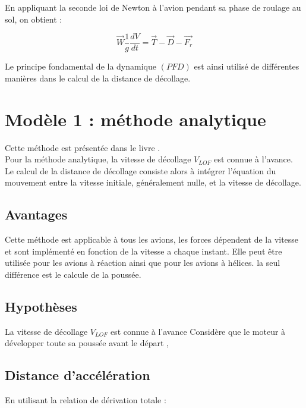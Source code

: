 	
	En appliquant la seconde loi de Newton à l’avion pendant sa phase de roulage au sol, on obtient :	
	
	\begin{equation} \label{PFD}
		\vec{W} \frac{1}{g}\frac{dV}{dt}=\vec{T} - \vec{D} - \vec{F_r} 
	\end{equation}
	
	
	Le principe fondamental de la dynamique $(PFD)$ est ainsi utilisé de différentes manières dans le calcul de la distance de décollage.
	
	
	
	
	
	
	
	
	
	
	\section{ Modèle 1 : méthode analytique }
		Cette méthode est présentée dans le livre  \cite{War:09}. \\
		
		Pour la méthode analytique, la vitesse de décollage $V_{LOF}$ est connue à l'avance. Le calcul de la distance de décollage consiste alors à intégrer l'équation du mouvement entre la vitesse initiale, généralement nulle, et la vitesse de décollage.
		
		
		\subsection{Avantages}
		
			Cette méthode est applicable à tous les avions, les forces dépendent de la vitesse et sont implémenté en fonction de la vitesse a chaque instant. Elle peut être utilisée pour les avions à réaction ainsi que pour les avions à hélices. la seul différence est le calcule de la poussée.
			
			\vspace{0.3cm}
			
		\subsection{Hypothèses}
		
			La vitesse de décollage $V_{LOF}$ est connue à l'avance
			Considère que le moteur à développer toute sa poussée avant le départ ,
		\vspace{0.3cm}
		
		\subsection{Distance d'accélération}
			En utilisant la relation de dérivation totale :
			
